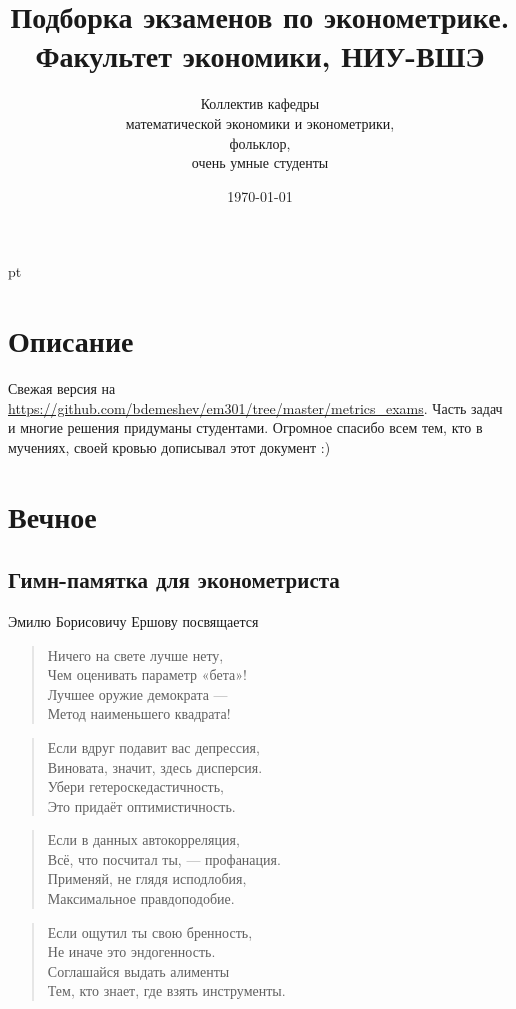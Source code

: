 \documentclass[12pt, a4paper]{article}\usepackage[]{graphicx}\usepackage[]{color}
\title{Подборка экзаменов по эконометрике. \\Факультет экономики, НИУ-ВШЭ}
\date{\today}
\author{Коллектив кафедры \\
математической экономики и эконометрики,\\
 фольклор, \\
 очень умные студенты}
\begin{document}
\maketitle

\tableofcontents{}


 pt %

\section{Описание}

Свежая версия на \url{https://github.com/bdemeshev/em301/tree/master/metrics_exams}. Часть задач и многие решения придуманы студентами. Огромное спасибо всем тем, кто в мучениях, своей кровью дописывал этот документ :)

\section{Вечное}

\subsection{Гимн-памятка для эконометриста}

Эмилю Борисовичу Ершову посвящается


\begin{verse}
Ничего на свете лучше нету, \\
Чем оценивать параметр «бета»! \\
Лучшее оружие демократа — \\
Метод наименьшего квадрата!
\end{verse}

\begin{verse}
Если вдруг подавит вас депрессия, \\
Виновата, значит, здесь дисперсия. \\
Убери гетероскедастичность, \\
Это придаёт оптимистичность.
\end{verse}

\begin{verse}
Если в данных автокорреляция, \\
Всё, что посчитал ты, — профанация. \\
Применяй, не глядя исподлобия, \\
Максимальное правдоподобие.
\end{verse}

\begin{verse}
Если ощутил ты свою бренность, \\
Не иначе это эндогенность. \\
Соглашайся выдать алименты \\
Тем, кто знает, где взять инструменты.
\end{verse}
\end{document}
